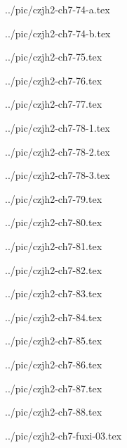 ../pic/czjh2-ch7-74-a.tex



../pic/czjh2-ch7-74-b.tex



../pic/czjh2-ch7-75.tex



../pic/czjh2-ch7-76.tex



../pic/czjh2-ch7-77.tex



../pic/czjh2-ch7-78-1.tex



../pic/czjh2-ch7-78-2.tex



../pic/czjh2-ch7-78-3.tex



../pic/czjh2-ch7-79.tex



../pic/czjh2-ch7-80.tex



../pic/czjh2-ch7-81.tex



../pic/czjh2-ch7-82.tex



../pic/czjh2-ch7-83.tex



../pic/czjh2-ch7-84.tex



../pic/czjh2-ch7-85.tex



../pic/czjh2-ch7-86.tex



../pic/czjh2-ch7-87.tex



../pic/czjh2-ch7-88.tex



../pic/czjh2-ch7-fuxi-03.tex



